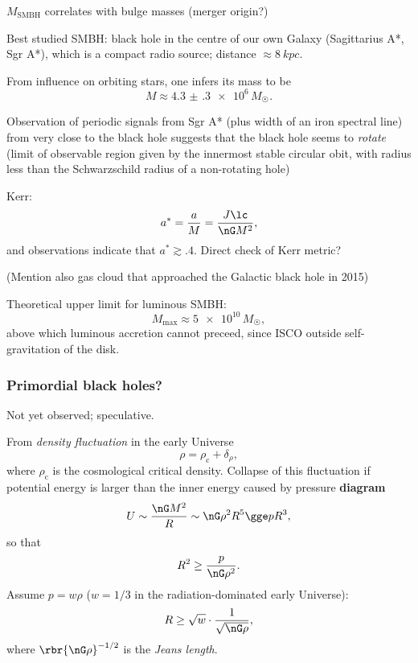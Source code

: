 $M_\text{SMBH}$ correlates with bulge masses (merger origin?)

Best studied SMBH: black hole in the centre of our own Galaxy (Sagittarius A*, 
Sgr A*), which is a compact radio source; distance $\approx \SI{8}{kpc}$.

From influence on orbiting stars, one infers its mass to be
\begin{equation}
M\approx \num{4.3(3)e6}\,M_\astrosun.
\end{equation}

Observation of periodic signals from Sgr A* (plus width of an iron spectral 
line) from very close to the black hole suggests that the black hole seems to 
\emph{rotate} (limit of observable region given by the innermost stable 
circular obit, with radius less than the Schwarzschild radius of a non-rotating 
hole)

Kerr:
\begin{equation}
a^* = \frac{a}{M} = \frac{J\lc}{\nG M^2},
\end{equation}
and observations indicate that $a^* \gtrsim \num{.4}$. Direct check of Kerr 
metric?

(Mention also gas cloud that approached the Galactic black hole in 2015)

Theoretical upper limit for luminous SMBH:
\begin{equation}
M_\text{max} \approx \num{5e10}\,M_\astrosun,
\end{equation}
above which luminous accretion cannot preceed, since ISCO outside 
self-gravitation of the disk.

\subsubsection{Primordial black holes?}

Not yet observed; speculative.

From \emph{density fluctuation} in the early Universe
\begin{equation}
\rho = \rho_\text{c} + \delta_\rho,
\end{equation}
where $\rho_\text{c}$ is the cosmological critical density. Collapse of this 
fluctuation if potential energy is larger than the inner energy caused by 
pressure \textbf{diagram}
\begin{equation}
U\sim \frac{\nG M^2}{R} \sim \nG \rho^2 R^5 \gge p R^3,
\end{equation}
so that
\begin{equation}
R^2 \ge \frac{p}{\nG \rho^2}.
\end{equation}
Assume $p = w\rho$ ($w = 1/3$ in the radiation-dominated early Universe):
\begin{equation}
R \ge \sqrt{w}\cdot\frac{1}{\sqrt{\nG \rho}},
\end{equation}
where $\rbr{\nG \rho}^{-1/2}$ is the \emph{Jeans length}.

